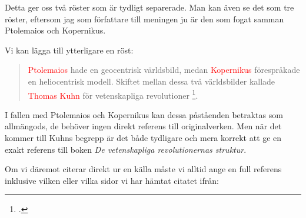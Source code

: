 \documentclass[11pt,a5paper,footinclude=true,headinclude=true]{scrbook} %
\begin{document}
\noindent Detta ger oss två röster som är tydligt separerade. Man kan även se det som tre röster, eftersom jag som författare till meningen ju är den som fogat samman Ptolemaios och Kopernikus. 

Vi kan lägga till ytterligare en röst:

\begin{quote}
\textcolor{red}{Ptolemaios} hade en geocentrisk världsbild, medan \textcolor{red}{Kopernikus} förespråkade en heliocentrisk modell. Skiftet mellan dessa två världsbilder kallade \textcolor{red}{Thomas Kuhn} för vetenskapliga revolutioner \footcite{kuhnVetenskapligaRevolutionernasStruktur1979}.
\end{quote}

\noindent I fallen med Ptolemaios och Kopernikus kan dessa påståenden betraktas som allmängods, de behöver ingen direkt referens till originalverken. Men när det kommer till Kuhns begrepp är det både tydligare och mera korrekt att ge en exakt referens till boken \emph{De vetenskapliga revolutionernas struktur}.

Om vi däremot citerar direkt ur en källa måste vi alltid ange en full referens inklusive vilken eller vilka sidor vi har hämtat citatet ifrån:
\end{document}
